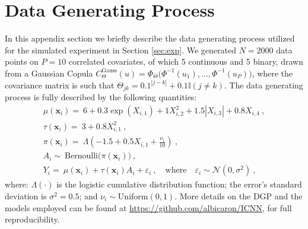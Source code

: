 \documentclass[nohyperref]{article}
\theoremstyle{plain}
\theoremstyle{definition}
\theoremstyle{remark}
\begin{document}
\nocite{*}





\newpage
\appendix
\onecolumn


\section{Data Generating Process} \label{sec:appA}

In this appendix section we briefly describe the data generating process utilized for the simulated experiment in Section \ref{sec:exp}. We generated $N=2000$ data points on $P=10$ correlated covariates, of which 5 continuous and 5 binary, drawn from a Gaussian Copula $C^{\text{Gauss}}_{\Theta} (u) = \Phi_{\Theta} \big( \Phi^{-1}(u_1), \dots , \Phi^{-1}(u_P) \big) $, where the covariance matrix is such that $\Theta_{jk} = 0.1^{|j - k|} + 0.1\mathbb{I}(j \neq k) $. The data generating process is fully described by the following quantities: 
\begin{equation} \label{eq:tarselstudy}
\begin{gathered}
\mu (\bm{x}_i) = ~ 6 + 0.3 \exp(X_{i,1}) + 1 X^2_{i,2} + 1.5 | X_{i, 3} | + 0.8 X_{i,4} ~ , \\
\tau (\bm{x}_i) = ~ 3 + 0.8 X^2_{i,1} ~ , \\
\pi (\bm{x}_i) = ~ \Lambda \left( -1.5 + 0.5 X_{i, 1} + \frac{\nu_i}{10} \right) ~ ,  \\
A_i \sim  ~  \text{Bernoulli} \big( \pi (\bm{x}_i) \big) ~ ,  \\
Y_i =  ~  \mu (\bm{x}_i) + \tau (\bm{x}_i) A_i + \varepsilon_i ~ , \quad \text{where} \quad \varepsilon_i \sim \mathcal{N} (0, \sigma^2) ~ ,
\end{gathered}
\end{equation}
where: $\Lambda(\cdot)$ is the logistic cumulative distribution function; the error's standard deviation is $\sigma^2 = 0.5$; and $\nu_i \sim \text{Uniform} (0, 1)$. More details on the DGP and the models employed can be found at \url{https://github.com/albicaron/ICNN}, for full reproducibility.
\end{document}
